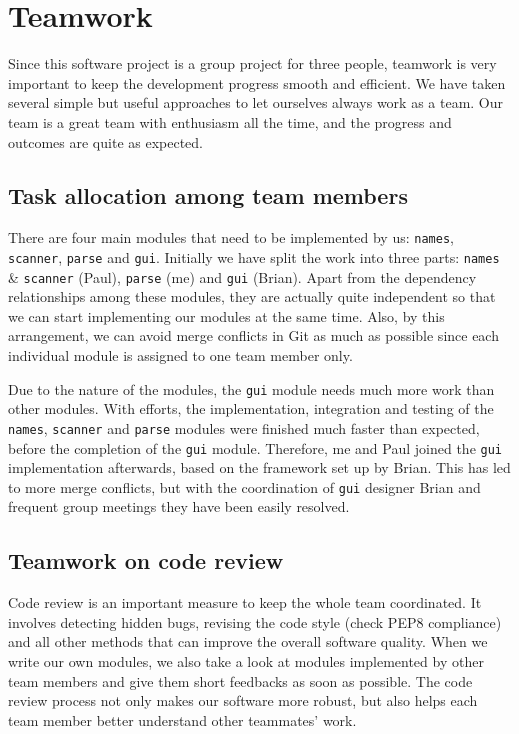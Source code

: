 \documentclass[10pt,a4paper]{article}
\begin{document}
\section{Teamwork}
\label{sec:orgccb520f}

Since this software project is a group project for three people,
teamwork is very important to keep the development progress smooth and
efficient. We have taken several simple but useful approaches to let
ourselves always work as a team. Our team is a great team with
enthusiasm all the time, and the progress and outcomes are quite as
expected.

\subsection{Task allocation among team members}
\label{sec:org1a6ee52}

There are four main modules that need to be implemented by us:
\texttt{names}, \texttt{scanner}, \texttt{parse} and \texttt{gui}. Initially we have split the
work into three parts: \texttt{names} \& \texttt{scanner} (Paul), \texttt{parse} (me) and
\texttt{gui} (Brian). Apart from the dependency relationships among these
modules, they are actually quite independent so that we can start
implementing our modules at the same time. Also, by this arrangement,
we can avoid merge conflicts in Git as much as possible since each
individual module is assigned to one team member only.

Due to the nature of the modules, the \texttt{gui} module needs much more
work than other modules. With efforts, the implementation, integration
and testing of the \texttt{names}, \texttt{scanner} and \texttt{parse} modules were
finished much faster than expected, before the completion of the \texttt{gui}
module. Therefore, me and Paul joined the \texttt{gui} implementation
afterwards, based on the framework set up by Brian. This has led to
more merge conflicts, but with the coordination of \texttt{gui} designer
Brian and frequent group meetings they have been easily resolved.

\subsection{Teamwork on code review}
\label{sec:orgda3e6d5}

Code review is an important measure to keep the whole team
coordinated. It involves detecting hidden bugs, revising the code
style (check PEP8 compliance) and all other methods that can improve
the overall software quality. When we write our own modules, we also
take a look at modules implemented by other team members and give them
short feedbacks as soon as possible. The code review process not only
makes our software more robust, but also helps each team member better
understand other teammates' work.
\end{document}
